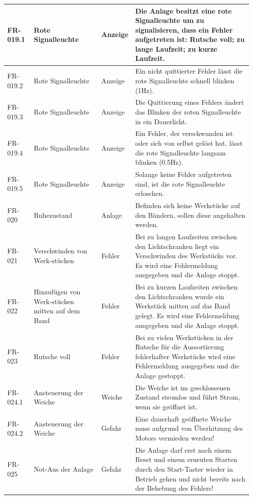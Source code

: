 \documentclass[oneside,a4paper,titlepage]{scrartcl} %
\begin{document}
\begin{small}
\begin{longtable}{|p{2cm}|p{4cm}|p{1.5cm}|p{5.5cm}|}
  \hline
  FR-019.1 & Rote Signalleuchte & Anzeige & Die Anlage besitzt eine rote Signalleuchte um zu signalisieren, dass ein Fehler aufgetreten ist: Rutsche voll; zu lange Laufzeit; zu kurze Laufzeit.\\
  \hline
  FR-019.2 & Rote Signalleuchte & Anzeige & Ein nicht quittierter Fehler lässt die rote Signalleuchte schnell blinken (1Hz).\\
  \hline
  FR-019.3 & Rote Signalleuchte & Anzeige & Die Quittierung eines Fehlers ändert das Blinken der roten Signalleuchte in ein Dauerlicht.\\
  \hline
  FR-019.4 & Rote Signalleuchte & Anzeige & Ein Fehler, der verschwunden ist oder sich von selbst gelöst hat, lässt die rote Signalleuchte langsam blinken (0.5Hz).\\
  \hline
  FR-019.5 & Rote Signalleuchte & Anzeige & Solange keine Fehler aufgetreten sind, ist die rote Signalleuchte erloschen.\\
  \hline
  \rowcolor{gray} FR-020 & Ruhezustand & Anlage & Befinden sich keine Werkstücke auf den Bändern, sollen diese angehalten werden.\\
  \hline
  FR-021 & Verschwinden von Werk-stücken & Fehler & Bei zu langen Laufzeiten zwischen den Lichtschranken liegt ein Verschwinden des Werkstücks vor. Es wird eine Fehlermeldung ausgegeben und die Anlage stoppt.\\
  \hline
  \rowcolor{gray} FR-022 & Hinzufügen von Werk-stücken mitten auf dem Band & Fehler & Bei zu kurzen Laufzeiten zwischen den Lichtschranken wurde ein Werkstück mitten auf das Band gelegt. Es wird eine Fehlermeldung ausgegeben und die Anlage stoppt.\\
  \hline
  FR-023 & Rutsche voll & Fehler & Bei zu vielen Werkstücken in der Rutsche für die Aussortierung fehlerhafter Werkstücke wird eine Fehlermeldung ausgegeben und die Anlage gestoppt.\\
  \hline
  \rowcolor{gray} FR-024.1 & Ansteuerung der Weiche & Weiche & Die Weiche ist im geschlossenen Zustand stromlos und führt Strom, wenn sie geöffnet ist.\\
  \hline
  \rowcolor{gray} FR-024.2 & Ansteuerung der Weiche & Gefahr & Eine dauerhaft geöffnete Weiche muss aufgrund von Überhitzung des Motors vermieden werden!\\
  \hline
  FR-025 & Not-Aus der Anlage & Gefahr & Die Anlage darf erst nach einem Reset und einem erneuten Starten durch den Start-Taster wieder in Betrieb gehen und nicht bereits nach der Behebung des Fehlers!\\

\end{longtable}
\end{small}
\end{document}
